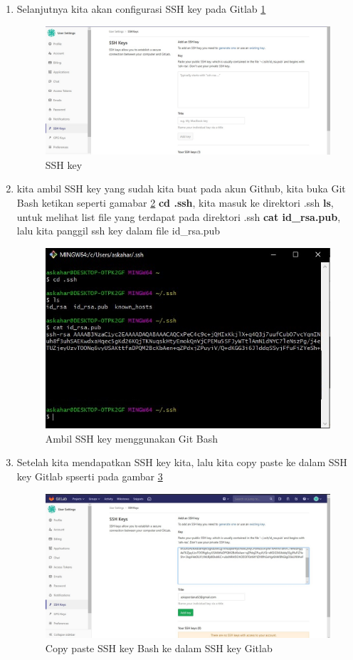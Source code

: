 \begin{enumerate}
\item Selanjutnya kita akan configurasi SSH key pada Gitlab \ref{sshkey}
\begin{figure}[!htbp]
\centerline{\includegraphics[width=.75\textwidth]{Figures/akunGit/gitlab5.jpg}}
\caption{SSH key}
\label{sshkey}
\end{figure}

\item kita ambil SSH key yang sudah kita buat pada akun Github, kita buka Git Bash ketikan seperti gamabar \ref{sshbash}
\subitem \textbf{cd .ssh}, kita masuk ke direktori .ssh
\subitem \textbf{ls}, untuk melihat list file yang terdapat pada direktori .ssh
\subitem \textbf{cat id\_rsa.pub}, lalu kita panggil ssh key dalam file id\_rsa.pub
\begin{figure}[!htbp]
\centerline{\includegraphics[width=.75\textwidth]{Figures/akunGit/gitlab6.jpg}}
\caption{Ambil SSH key menggunakan Git Bash}
\label{sshbash}
\end{figure}

\item Setelah kita mendapatkan SSH key kita, lalu kita copy paste ke dalam SSH key Gitlab spserti pada gambar \ref{copypaste}
\begin{figure}[!htbp]
\centerline{\includegraphics[width=.75\textwidth]{Figures/akunGit/gitlab7.jpg}}
\caption{Copy paste SSH key Bash ke dalam SSH key Gitlab}
\label{copypaste}
\end{figure}


\end{enumerate}

